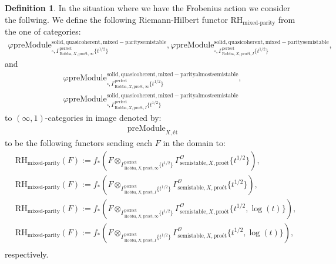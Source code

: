 \documentclass[12pt]{book}
\theoremstyle{definition}
\newtheorem{definition}{Definition}
\begin{document}
\begin{definition}
In the situation where we have the Frobenius action we consider the follwing. We define the following Riemann-Hilbert functor $\text{RH}_\text{mixed-parity}$ from the one of categories:
\begin{align}
\varphi\mathrm{preModule}^\mathrm{solid,quasicoherent,mixed-paritysemistable}_{\square,\Gamma^\mathrm{perfect}_{\text{Robba},X,\text{pro\'et},\infty}\{t^{1/2}\}},
\varphi\mathrm{preModule}^\mathrm{solid,quasicoherent,mixed-paritysemistable}_{\square,\Gamma^\mathrm{perfect}_{\text{Robba},X,\text{pro\'et},I}\{t^{1/2}\}}, 
\end{align}
and
\begin{align}
\varphi\mathrm{preModule}^\mathrm{solid,quasicoherent,mixed-parityalmostsemistable}_{\square,\Gamma^\mathrm{perfect}_{\text{Robba},X,\text{pro\'et},\infty}\{t^{1/2}\}},\\
\varphi\mathrm{preModule}^\mathrm{solid,quasicoherent,mixed-parityalmostsemistable}_{\square,\Gamma^\mathrm{perfect}_{\text{Robba},X,\text{pro\'et},I}\{t^{1/2}\}} 
\end{align}
to $(\infty,1)$-categories in image denoted by:
\begin{align}
\mathrm{preModule}_{X,\text{\'et}}
\end{align}
to be the following functors sending each $F$ in the domain to:
\begin{align}
&\text{RH}_\text{mixed-parity}(F):=f_*(F\otimes_{\Gamma^\mathrm{perfect}_{\text{Robba},X,\text{pro\'et},\infty}\{t^{1/2}\}} \Gamma^\mathcal{O}_{\text{semistable},X,\text{pro\'et}}\{t^{1/2}\}),\\
&\text{RH}_\text{mixed-parity}(F):=f_*(F\otimes_{\Gamma^\mathrm{perfect}_{\text{Robba},X,\text{pro\'et},I}\{t^{1/2}\}} \Gamma^\mathcal{O}_{\text{semistable},X,\text{pro\'et}}\{t^{1/2}\}),\\
&\text{RH}_\text{mixed-parity}(F):=f_*(F\otimes_{\Gamma^\mathrm{perfect}_{\text{Robba},X,\text{pro\'et},\infty}\{t^{1/2}\}} \Gamma^\mathcal{O}_{\text{semistable},X,\text{pro\'et}}\{t^{1/2},\log(t)\}),\\
&\text{RH}_\text{mixed-parity}(F):=f_*(F\otimes_{\Gamma^\mathrm{perfect}_{\text{Robba},X,\text{pro\'et},I}\{t^{1/2}\}} \Gamma^\mathcal{O}_{\text{semistable},X,\text{pro\'et}}\{t^{1/2},\log(t)\}),\\
\end{align}
respectively.

\end{definition}
\end{document}
